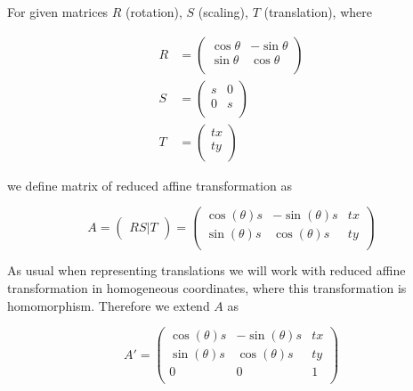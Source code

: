 \begin{defn}
For given matrices $R$ (rotation), $S$ (scaling), $T$ (translation), where

\begin{align}
    R &=
    \begin{pmatrix}
        \cos{\theta} & -\sin{\theta} \\
        \sin{\theta} & \cos{\theta} \\
    \end{pmatrix} \\
    S &=
    \begin{pmatrix}
        s & 0 \\
        0 & s \\
    \end{pmatrix} \\
    T &=
    \begin{pmatrix}
        tx \\
        ty \\
    \end{pmatrix}
\end{align}

we define matrix of reduced affine transformation as

\begin{equation}
    A =
    \begin{pmatrix}
        RS|T
    \end{pmatrix}
    =
    \begin{pmatrix}
        \cos(\theta)s & -\sin(\theta)s & tx \\
        \sin(\theta)s & \cos(\theta)s & ty \\
    \end{pmatrix}
\end{equation}
\end{defn}

As usual when representing translations we will work with reduced affine transformation in homogeneous coordinates, where this transformation is homomorphism. Therefore we extend $A$ as

\begin{equation}
    A' =
    \begin{pmatrix}
        \cos(\theta)s & -\sin(\theta)s & tx \\
        \sin(\theta)s & \cos(\theta)s & ty \\
        0 & 0 & 1 \\
    \end{pmatrix}
\end{equation}

